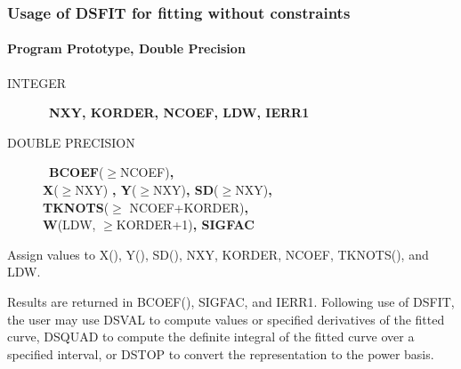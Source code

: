 \documentclass[twoside]{MATH77}
\begin{document}
\subsubsection{Usage of DSFIT for fitting without constraints\label{dsfit}}

\paragraph{Program Prototype, Double Precision}
\begin{description}
\item[INTEGER]  \ {\bf NXY, KORDER, NCOEF, LDW, IERR1}

\item[DOUBLE PRECISION]  \ {\bf BCOEF}($\geq $NCOEF){\bf ,\\ X}($\geq $NXY)%
{\bf , Y}($\geq $NXY){\bf , SD}($\geq $NXY){\bf ,\\ TKNOTS}($\geq $%
NCOEF+KORDER){\bf ,\\
W}(LDW, $\geq $KORDER+1){\bf , SIGFAC}
\end{description}
Assign values to X(), Y(), SD(), NXY, KORDER, NCOEF, TKNOTS(), and LDW.
\begin{center}
\end{center}
Results are returned in BCOEF(), SIGFAC, and IERR1. Following
use of DSFIT, the user may use DSVAL to compute values or specified
derivatives of the fitted curve, DSQUAD to compute the definite integral of
the fitted curve over a specified interval, or DSTOP to convert the
representation to the power basis.
\end{document}
